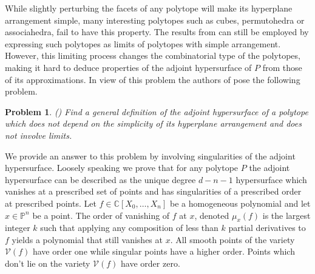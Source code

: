 \documentclass[a4paper,10pt]{amsart}
\theoremstyle{definition}
\theoremstyle{plain}
\newtheorem{prob}[defin]{Problem}
\newcommand{\cV}{{\mathcal V}}
\newcommand{\C}{{\mathbb C}}
\newcommand{\pp}{\mathbb{P}}
\begin{document}
While slightly perturbing the facets of any polytope will make its hyperplane arrangement simple, many interesting polytopes such as cubes, permutohedra or associahedra, fail to have this property. The results from \cite{KohnRanestad2019AdjCurves} can still be employed by expressing such polytopes as limits of polytopes with simple arrangement. However, this limiting process changes the combinatorial type of the polytopes, making it hard to deduce properties of the adjoint hypersurface of $P$ from those of its approximations. In view of this problem the authors of \cite{KohnRanestad2019AdjCurves} pose the following problem.
\begin{prob}(\cite[Problem 2]{KohnRanestad2019AdjCurves})
     Find a general definition of the adjoint hypersurface of a polytope which does not
depend on the simplicity of its hyperplane arrangement and does not involve limits.
\end{prob}


We provide an answer to this problem by involving singularities of the adjoint hypersurface. Loosely speaking we prove that for any polytope $P$ the adjoint hypersurface can be described as the unique degree $d-n-1$ hypersurface which vanishes at a prescribed set of points and has singularities of a prescribed order at prescribed points. Let $f\in \C[X_0,\ldots,X_n]$ be a homogeneous polynomial and let $x\in \pp^n$ be a point. The order of vanishing of $f$ at $x$, denoted $\mu_x(f)$ is the largest integer $k$ such that applying any composition of less than $k$ partial derivatives to $f$ yields a polynomial that still vanishes at $x$. All smooth points of the variety $\cV(f)$ have order one while singular points have a higher order. Points which don't lie on the variety $\cV(f)$ have order zero. 
\end{document}
